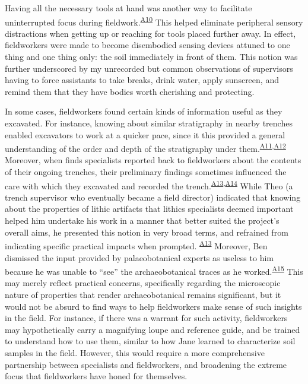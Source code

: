\documentclass[
]{article}
\begin{document}
Having all the necessary tools at hand was another way to facilitate
uninterrupted focus during
fieldwork.\textsuperscript{\hyperref[sec-A10]{A10}} This helped
eliminate peripheral sensory distractions when getting up or reaching
for tools placed further away. In effect, fieldworkers were made to
become disembodied sensing devices attuned to one thing and one thing
only: the soil immediately in front of them. This notion was further
underscored by my unrecorded but common observations of supervisors
having to force assistants to take breaks, drink water, apply sunscreen,
and remind them that they have bodies worth cherishing and protecting.

In some cases, fieldworkers found certain kinds of information useful as
they excavated. For instance, knowing about similar stratigraphy in
nearby trenches enabled excavators to work at a quicker pace, since it
this provided a general understanding of the order and depth of the
stratigraphy under
them.\textsuperscript{\hyperref[sec-A11]{A11},\hyperref[sec-A12]{A12}}
Moreover, when finds specialists reported back to fieldworkers about the
contents of their ongoing trenches, their preliminary findings sometimes
influenced the care with which they excavated and recorded the
trench.\textsuperscript{\hyperref[sec-A13]{A13},\hyperref[sec-A14]{A14}}
While Theo (a trench supervisor who eventually became a field director)
indicated that knowing about the properties of lithic artifacts that
lithics specialists deemed important helped him undertake his work in a
manner that better suited the project's overall aims, he presented this
notion in very broad terms, and refrained from indicating specific
practical impacts when prompted.
\textsuperscript{\hyperref[sec-A13]{A13}} Moreover, Ben dismissed the
input provided by palaeobotanical experts as useless to him because he
was unable to ``see'' the archaeobotanical traces as he
worked.\textsuperscript{\hyperref[sec-A15]{A15}} This may merely reflect
practical concerns, specifically regarding the microscopic nature of
properties that render archaeobotanical remains significant, but it
would not be absurd to find ways to help fieldworkers make sense of such
insights in the field. For instance, if there was a warrant for such
activity, fieldworkers may hypothetically carry a magnifying loupe and
reference guide, and be trained to understand how to use them, similar
to how Jane learned to characterize soil samples in the field. However,
this would require a more comprehensive partnership between specialists
and fieldworkers, and broadening the extreme focus that fieldworkers
have honed for themselves.
\end{document}
